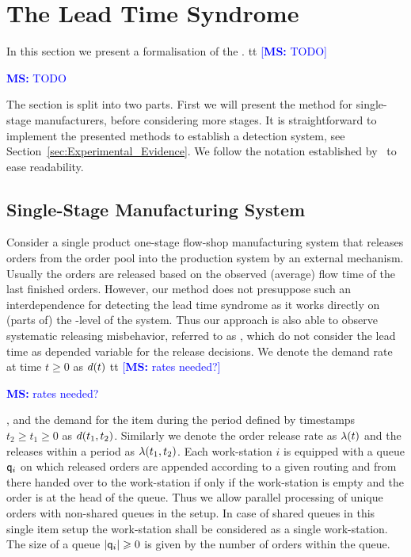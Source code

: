 \documentclass[mnsc]{informs3}
\newcommand\MS[2][r]{\ifx t#1 \textcolor{blue}{[\textbf{MS:} #2]}
  \else \begin{center}\textcolor{blue}{\textbf{MS:} #2} \end{center} \fi}
\begin{document}
\section{The Lead Time Syndrome}
\label{sec:The_Lead_Time_Syndrome}

In this section we present a formalisation of the \LTS{}.
%
\MS[t]{TODO} The section is split into two
parts. First we will present the method for single-stage manufacturers, before considering more
stages.
%
It is straightforward to implement the presented methods to establish a \LTS{} detection system, see
Section~\ref{sec:Experimental_Evidence}. We follow the notation established
by~\cite{selccuk2013adaptive} to ease readability.

\subsection{Single-Stage Manufacturing System}
\label{subsec:Single-Stage_Manufacturing_System}


Consider a single product one-stage flow-shop manufacturing system that releases orders from the
order pool into the production system by an external mechanism.
%
Usually the orders are released based on the observed (average) flow time of the last finished
orders. However, our method does not presuppose such an interdependence for detecting the lead time
syndrome as it works directly on (parts of) the \WIP{}-level of the system. Thus our approach is
also able to observe systematic releasing misbehavior, referred to as \LTS{}, which do not consider
the lead time as depended variable for the release decisions.
%
%
We denote the demand rate at time $t \geqslant 0$ as ${d}(t)$ \MS[t]{rates needed?}, and the demand
for the item during the period defined by timestamps $t_{2} \geqslant t_{1} \geqslant 0$ as
${d}(t_{1},t_{2})$. Similarly we denote the order release rate as ${\lambda} (t)$ and the releases within
a period as ${{\lambda}} (t_{1},t_{2})$. Each work-station $i$ is equipped with a queue $\mathsf{q}_{i}$ on which
released orders are appended according to a given routing and from there handed over to the
work-station if only if the work-station is empty and the order is at the head of the queue. Thus we
allow parallel processing of unique orders with non-shared queues in the setup. In case of shared
queues in this single item setup the work-station shall be considered as a single work-station. The
size of a queue $\lvert{\mathsf{q}_{i}}\rvert \geqslant 0$ is given by the number of orders within the queue.
\end{document}
